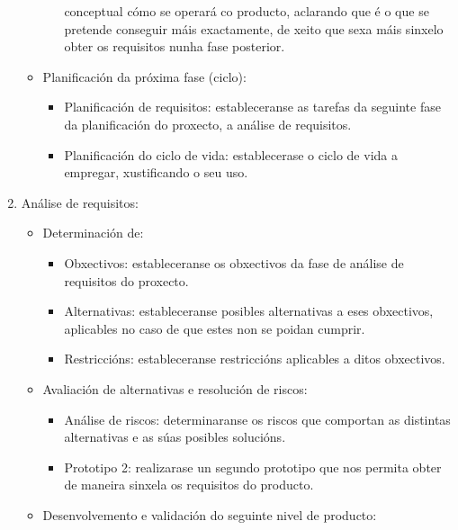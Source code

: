 \begin{enumerate}
\begin{itemize}
\begin{itemize}
                     conceptual cómo se operará co producto, aclarando que é o
                     que se pretende conseguir máis exactamente, de xeito que
                     sexa máis sinxelo obter os requisitos nunha fase
                     posterior.
              \end{itemize}
        \item Planificación da próxima fase (ciclo):
              \begin{itemize}
               \item Planificación de requisitos: estableceranse as tarefas da
                     seguinte fase da planificación do proxecto, a análise de
                     requisitos.
               \item Planificación do ciclo de vida: establecerase o ciclo de
                     vida a empregar, xustificando o seu uso.
              \end{itemize}
       \end{itemize}
 \item Análise de requisitos:
       \begin{itemize}
        \item Determinación de:
              \begin{itemize}
               \item Obxectivos: estableceranse os obxectivos da fase de
                     análise de requisitos do proxecto.
               \item Alternativas: estableceranse posibles alternativas a eses
                     obxectivos, aplicables no caso de que estes non se poidan
                     cumprir.
               \item Restriccións: estableceranse restriccións aplicables a
                     ditos obxectivos.
              \end{itemize}
        \item Avaliación de alternativas e resolución de riscos:
              \begin{itemize}
               \item Análise de riscos: determinaranse os riscos que comportan
                     as distintas alternativas e as súas posibles solucións.
               \item Prototipo 2: realizarase un segundo prototipo que nos
                     permita obter de maneira sinxela os requisitos do
                     producto.
              \end{itemize}
        \item Desenvolvemento e validación do seguinte nivel de producto:

\end{itemize}
\end{enumerate}
